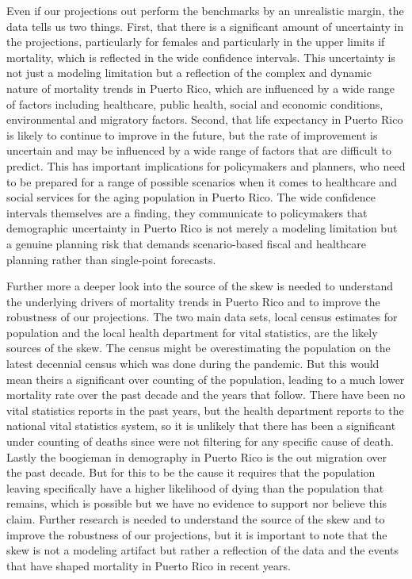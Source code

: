 \documentclass[
  12pt,
]{report}
\begin{document}
Even if our projections out perform the benchmarks by an unrealistic
margin, the data tells us two things. First, that there is a significant
amount of uncertainty in the projections, particularly for females and
particularly in the upper limits if mortality, which is reflected in the
wide confidence intervals. This uncertainty is not just a modeling
limitation but a reflection of the complex and dynamic nature of
mortality trends in Puerto Rico, which are influenced by a wide range of
factors including healthcare, public health, social and economic
conditions, environmental and migratory factors. Second, that life
expectancy in Puerto Rico is likely to continue to improve in the
future, but the rate of improvement is uncertain and may be influenced
by a wide range of factors that are difficult to predict. This has
important implications for policymakers and planners, who need to be
prepared for a range of possible scenarios when it comes to healthcare
and social services for the aging population in Puerto Rico. The wide
confidence intervals themselves are a finding, they communicate to
policymakers that demographic uncertainty in Puerto Rico is not merely a
modeling limitation but a genuine planning risk that demands
scenario-based fiscal and healthcare planning rather than single-point
forecasts.

Further more a deeper look into the source of the skew is needed to
understand the underlying drivers of mortality trends in Puerto Rico and
to improve the robustness of our projections. The two main data sets,
local census estimates for population and the local health department
for vital statistics, are the likely sources of the skew. The census
might be overestimating the population on the latest decennial census
which was done during the pandemic. But this would mean theirs a
significant over counting of the population, leading to a much lower
mortality rate over the past decade and the years that follow. There
have been no vital statistics reports in the past years, but the health
department reports to the national vital statistics system, so it is
unlikely that there has been a significant under counting of deaths
since were not filtering for any specific cause of death. Lastly the
boogieman in demography in Puerto Rico is the out migration over the
past decade. But for this to be the cause it requires that the
population leaving specifically have a higher likelihood of dying than
the population that remains, which is possible but we have no evidence
to support nor believe this claim. Further research is needed to
understand the source of the skew and to improve the robustness of our
projections, but it is important to note that the skew is not a modeling
artifact but rather a reflection of the data and the events that have
shaped mortality in Puerto Rico in recent years.
\end{document}
